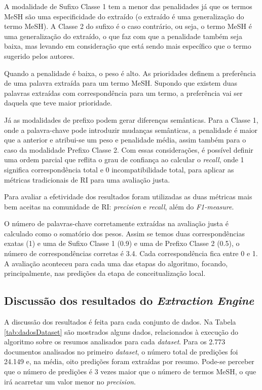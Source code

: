A modalidade de Sufixo Classe 1 tem a menor das penalidades já que os termos MeSH são uma especificidade do extraído (o extraído é uma generalização do termo MeSH). A Classe 2 do sufixo é o caso contrário, ou seja, o termo MeSH é uma generalização do extraído, o que faz com que a penalidade também seja baixa, mas levando em consideração que está sendo mais específico que o termo sugerido pelos autores.

Quando a penalidade é baixa, o peso é alto. As prioridades definem a preferência de uma palavra extraída para um termo MeSH. Supondo que existem duas palavras extraídas com correspondência para um termo, a preferência vai ser daquela que teve maior prioridade.

Já as modalidades de prefixo podem gerar diferenças semânticas. Para a Classe 1, onde a palavra-chave pode introduzir mudanças semânticas, a penalidade é maior que a anterior e atribui-se um peso e penalidade média, assim também para o caso da modalidade Prefixo Classe 2. Com essas considerações, é possível definir uma ordem parcial que reflita o grau de confiança ao calcular o \emph{recall}, onde 1 significa correspondência total e 0 incompatibilidade total, para aplicar as métricas tradicionais de RI para uma avaliação justa. 

Para avaliar a efetividade dos resultados foram utilizadas as duas métricas mais bem aceitas na comunidade de RI: \emph{precision} e \emph{recall}, além do \emph{F1-measure}.

O número de palavras-chave corretamente extraídas na avaliação justa é calculado como o somatório dos pesos. Assim se temos duas correspondências exatas (1) e uma de Sufixo Classe 1 (0.9) e uma de Prefixo Classe 2 (0.5), o número de correspondências corretas é 3.4. Cada correspondência fica entre 0 e 1. A avaliação aconteceu para cada uma das etapas do algoritmo, focando, principalmente, nas predições da etapa de conceitualização local.

\subsection{Discussão dos resultados do \emph{Extraction Engine}}
A discussão dos resultados é feita para cada conjunto de dados. Na Tabela \ref{tab:dadosDataset} são mostrados alguns dados, relacionados à execução do algoritmo sobre os resumos analisados para cada \emph{dataset}. Para os 2.773 documentos analisados no primeiro \emph{dataset}, o número total de predições foi 24.149 e, na média, oito predições foram extraídas por resumo. Pode-se perceber que o número de predições é 3 vezes maior que o número de termos MeSH, o que irá acarretar um valor menor no \emph{precision}.

